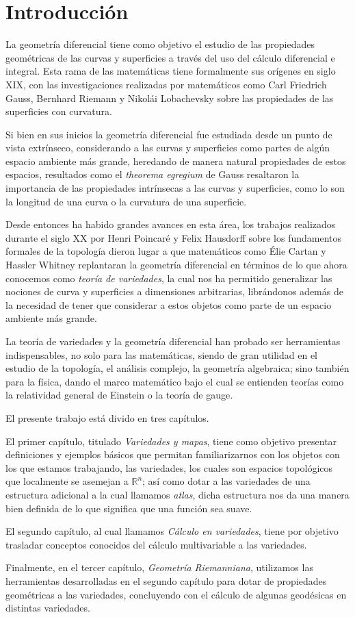 \chapter{Introducción}
La geometría diferencial tiene como objetivo el estudio de las propiedades geométricas de las curvas y superficies a través del uso del cálculo diferencial e integral. Esta rama de las matemáticas tiene formalmente sus orígenes en siglo XIX, con las investigaciones realizadas por matemáticos como Carl Friedrich Gauss, Bernhard Riemann y Nikolái Lobachevsky sobre las propiedades de las superficies con curvatura. 

Si bien en sus inicios la geometría diferencial fue estudiada desde un punto de vista extrínseco, considerando a las curvas y superficies como partes de algún espacio ambiente más grande, heredando de manera natural propiedades de estos espacios, resultados como el \textit{theorema egregium} de Gauss resaltaron la importancia de las propiedades intrínsecas a las curvas y superficies, como lo son la longitud de una curva o la curvatura de una superficie.

Desde entonces ha habido grandes avances en esta área, los trabajos realizados durante el siglo XX por Henri Poincaré y Felix Hausdorff sobre los fundamentos formales de la topología dieron lugar a que matemáticos como Élie Cartan y Hassler Whitney replantaran la geometría diferencial en términos de lo que ahora conocemos como \textit{teoría de variedades}, la cual nos ha permitido generalizar las nociones de curva y superficies a dimensiones arbitrarias, librándonos además de la necesidad de tener que considerar a estos objetos como parte de un espacio ambiente más grande.

La teoría de variedades y la geometría diferencial han probado ser herramientas indispensables, no solo para las matemáticas, siendo de gran utilidad en el estudio de la topología, el análisis complejo, la geometría algebraica; sino también para la física, dando el marco matemático bajo el cual se entienden teorías como la relatividad general de Einstein o la teoría de gauge.

El presente trabajo está divido en tres capítulos.

El primer capítulo, titulado \textit{Variedades y mapas}, tiene como objetivo presentar definiciones y ejemplos básicos que permitan familiarizarnos con los objetos con los que estamos trabajando, las variedades, los cuales son espacios topológicos que localmente se asemejan a $\mathbb{R}^{n}$; así como dotar a las variedades de una estructura adicional a la cual llamamos \textit{atlas}, dicha estructura nos da una manera bien definida de lo que significa que una función sea suave.

El segundo capítulo, al cual llamamos \textit{Cálculo en variedades}, tiene por objetivo trasladar conceptos conocidos del cálculo multivariable a las variedades.

Finalmente, en el tercer capítulo, \textit{Geometría Riemanniana}, utilizamos las herramientas desarrolladas en el segundo capítulo para dotar de propiedades geométricas a las variedades, concluyendo con el cálculo de algunas geodésicas en distintas variedades.
